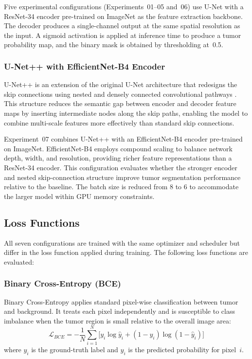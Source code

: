\documentclass[a4paper,12pt]{article}
\begin{document}
Five experimental configurations (Experiments~01--05 and~06) use U-Net with a ResNet-34 encoder
pre-trained on ImageNet as the feature extraction backbone. The decoder produces a single-channel
output at the same spatial resolution as the input. A sigmoid activation is applied at inference
time to produce a tumor probability map, and the binary mask is obtained by thresholding at~0.5.

\subsubsection{U-Net++ with EfficientNet-B4 Encoder}
\label{sub:unetpp_effb4}

U-Net++ is an extension of the original U-Net architecture that redesigns the skip connections
using nested and densely connected convolutional pathways \cite{zhou2019unetpp}. This structure
reduces the semantic gap between encoder and decoder feature maps by inserting intermediate
nodes along the skip paths, enabling the model to combine multi-scale features more effectively
than standard skip connections.

Experiment~07 combines U-Net++ with an EfficientNet-B4 encoder pre-trained on ImageNet.
EfficientNet-B4 employs compound scaling to balance network depth, width, and resolution,
providing richer feature representations than a ResNet-34 encoder. This configuration evaluates
whether the stronger encoder and nested skip-connection structure improve tumor segmentation
performance relative to the baseline. The batch size is reduced from 8 to 6 to accommodate the
larger model within GPU memory constraints.


\subsection{Loss Functions}
\label{sub:losses}

All seven configurations are trained with the same optimizer and scheduler but differ in the
loss function applied during training. The following loss functions are evaluated:

\subsubsection{Binary Cross-Entropy (BCE)}
Binary Cross-Entropy applies standard pixel-wise classification between tumor and background.
It treats each pixel independently and is susceptible to class imbalance when the tumor region
is small relative to the overall image area:
\begin{equation}
    \mathcal{L}_{BCE} = -\frac{1}{N}\sum_{i=1}^{N}
        \bigl[y_i \log \hat{y}_i + (1 - y_i) \log(1 - \hat{y}_i)\bigr]
\end{equation}
where $y_i$ is the ground-truth label and $\hat{y}_i$ is the predicted probability for pixel~$i$.
\end{document}
